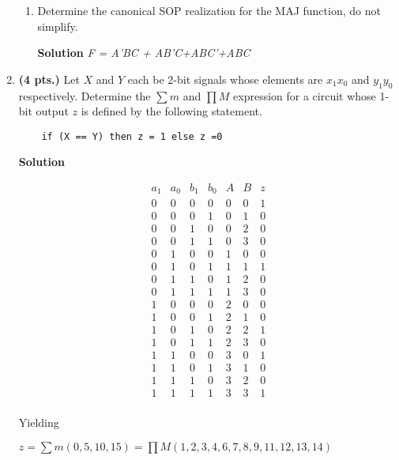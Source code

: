 \begin{enumerate}
\begin{enumerate}
	\item Determine the canonical SOP realization for the MAJ
	function, do not simplify.

\begin{onlysolution}  \textbf{Solution} \itshape
 F = A'BC + AB'C+ABC'+ABC
\end{onlysolution}
\end{enumerate}

\item \textbf{ (4 pts.)} Let $X$ and $Y$ each be 2-bit signals whose 
elements are $x_1 x_0$ and $y_1 y_0$ respectively.  Determine the 
$\sum m$ and $\prod M$ expression for a circuit whose 1-bit 
output $z$ is defined by the following statement.
\begin{verbatim}
	if (X == Y) then z = 1 else z =0
\end{verbatim}

\begin{onlysolution}  \textbf{Solution} \itshape

$$\begin{array}{c|c|c|c||c|c||c}
a_1 & a_0 & b_1 & b_0 & A  & B & z  \\ \hline
0 & 0 & 0 & 0 & 0 & 0 & 1  \\ \hline
0 & 0 & 0 & 1 & 0 & 1 & 0  \\ \hline
0 & 0 & 1 & 0 & 0 & 2 & 0  \\ \hline
0 & 0 & 1 & 1 & 0 & 3 & 0  \\ \hline
0 & 1 & 0 & 0 & 1 & 0 & 0  \\ \hline
0 & 1 & 0 & 1 & 1 & 1 & 1  \\ \hline
0 & 1 & 1 & 0 & 1 & 2 & 0  \\ \hline
0 & 1 & 1 & 1 & 1 & 3 & 0  \\ \hline
1 & 0 & 0 & 0 & 2 & 0 & 0  \\ \hline
1 & 0 & 0 & 1 & 2 & 1 & 0  \\ \hline
1 & 0 & 1 & 0 & 2 & 2 & 1  \\ \hline
1 & 0 & 1 & 1 & 2 & 3 & 0  \\ \hline
1 & 1 & 0 & 0 & 3 & 0 & 1  \\ \hline
1 & 1 & 0 & 1 & 3 & 1 & 0  \\ \hline
1 & 1 & 1 & 0 & 3 & 2 & 0  \\ \hline
1 & 1 & 1 & 1 & 3 & 3 & 1  \\
\end{array}$$

Yielding

$z = \sum m(0,5,10,15) = \prod M(1,2,3,4,6,7,8,9,11,12,13,14)$
\end{onlysolution}



\end{enumerate}
